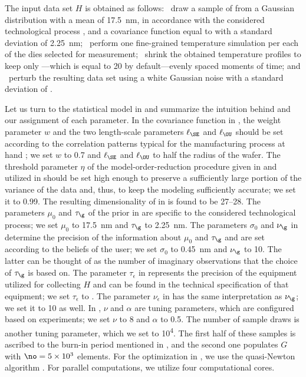 The input data set $H$ is obtained as follows: \one~draw a sample of \g from a
Gaussian distribution with a mean of 17.5~nm, in accordance with the considered
technological process \cite{ptm}, and a covariance function equal to
 with a standard deviation of 2.25~nm; \two~perform
one fine-grained temperature simulation per each of the \hnd dies selected for
measurement; \three~shrink the obtained temperature profiles to keep only
\ns---which is equal to 20 by default---evenly spaced moments of time; and
\four~perturb the resulting data set using a white Gaussian noise with a
standard deviation of .

Let us turn to the statistical model in  and
summarize the intuition behind and our assignment of each parameter. In the
covariance function in , the weight parameter $w$ and
the two length-scale parameters $\ell_\SE$ and $\ell_\OU$ should be set
according to the correlation patterns typical for the manufacturing process at
hand \cite{chandrakasan2000, cheng2011}; we set $w$ to 0.7 and $\ell_\SE$ and
$\ell_\OU$ to half the radius of the wafer. The threshold parameter $\eta$ of
the model-order-reduction procedure given in  and utilized
in  should be set high enough to preserve a
sufficiently large portion of the variance of the data and, thus, to keep the
modeling sufficiently accurate; we set it to 0.99. The resulting dimensionality
\nz of \vz in  is found to be 27--28. The parameters
$\mu_0$ and $\tau_\g$ of the prior in  are specific to the
considered technological process; we set $\mu_0$ to 17.5~nm and $\tau_\g$ to
2.25~nm. The parameters $\sigma_0$ and $\nu_\g$ in 
determine the precision of the information about $\mu_0$ and $\tau_\g$ and are
set according to the beliefs of the user; we set $\sigma_0$ to 0.45~nm and
$\nu_\g$ to 10. The latter can be thought of as the number of imaginary
observations that the choice of $\tau_\g$ is based on. The parameter
$\tau_\epsilon$ in  represents the precision of the
equipment utilized for collecting $H$ and can be found in the technical
specification of that equipment; we set $\tau_\epsilon$ to . The
parameter $\nu_\epsilon$ in  has the same interpretation
as $\nu_\g$; we set it to 10 as well. In , $\nu$ and
$\alpha$ are tuning parameters, which are configured based on experiments; we
set $\nu$ to 8 and $\alpha$ to 0.5. The number of sample draws is another tuning
parameter, which we set to 10\textsuperscript{4}. The first half of these
samples is ascribed to the burn-in period mentioned in
, and the second one populates $G$ with $\no = 5
\times 10^3$ elements. For the optimization in , we
use the quasi-Newton algorithm \cite{press2007}. For parallel computations, we
utilize four computational cores.

